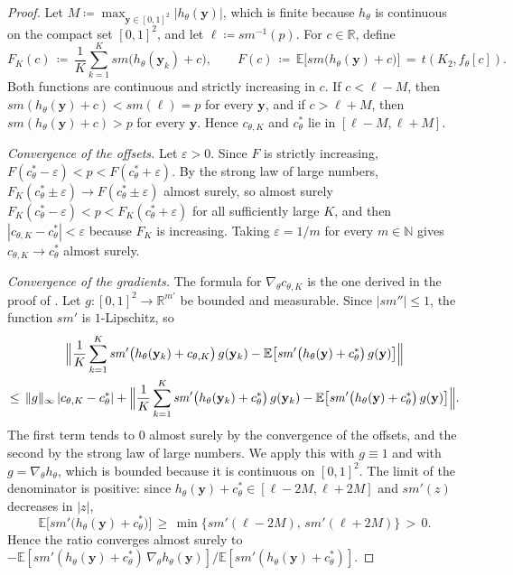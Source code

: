 \documentclass{article}
\theoremstyle{plain}
\theoremstyle{definition}
\theoremstyle{remark}
\newcommand*{\R}{\mathbb{R}}
\begin{document}
\begin{proof}
Let $M \coloneqq \max_{\mathbf{y} \in [0,1]^2} |h_\theta(\mathbf{y})|$, which is finite because $h_\theta$ is continuous on the compact set $[0,1]^2$, and let $\ell \coloneqq \mathit{sm}^{-1}(p)$. For $c \in \R$, define
\[
F_K(c) \,\coloneqq\, \frac{1}{K} \sum_{k=1}^{K} \mathit{sm}\bigl(h_\theta(\mathbf{y}_k) + c\bigr),
\qquad
F(c) \,\coloneqq\, \mathbb{E}\bigl[\mathit{sm}\bigl(h_\theta(\mathbf{y}) + c\bigr)\bigr] \,=\, t(K_2, f_\theta[c]).
\]
Both functions are continuous and strictly increasing in $c$. If $c < \ell - M$, then $\mathit{sm}(h_\theta(\mathbf{y}) + c) < \mathit{sm}(\ell) = p$ for every $\mathbf{y}$, and if $c > \ell + M$, then $\mathit{sm}(h_\theta(\mathbf{y}) + c) > p$ for every $\mathbf{y}$. Hence $c_{\theta,K}$ and $c^*_\theta$ lie in $[\ell - M, \ell + M]$.

\emph{Convergence of the offsets.} Let $\varepsilon > 0$. Since $F$ is strictly increasing, $F(c^*_\theta - \varepsilon) < p < F(c^*_\theta + \varepsilon)$. By the strong law of large numbers, $F_K(c^*_\theta \pm \varepsilon) \to F(c^*_\theta \pm \varepsilon)$ almost surely, so almost surely $F_K(c^*_\theta - \varepsilon) < p < F_K(c^*_\theta + \varepsilon)$ for all sufficiently large $K$, and then $|c_{\theta,K} - c^*_\theta| < \varepsilon$ because $F_K$ is increasing. Taking $\varepsilon = 1/m$ for every $m \in \mathbb{N}$ gives $c_{\theta,K} \to c^*_\theta$ almost surely.

\emph{Convergence of the gradients.} The formula for $\nabla_\theta c_{\theta,K}$ is the one derived in the proof of . Let $g : [0,1]^2 \to \R^{m'}$ be bounded and measurable. Since $|\mathit{sm}''| \le 1$, the function $\mathit{sm}'$ is $1$-Lipschitz, so
\begin{multline*}
\Bigl\| \frac{1}{K} \sum_{k=1}^{K} \mathit{sm}'\bigl(h_\theta(\mathbf{y}_k) + c_{\theta,K}\bigr)\, g(\mathbf{y}_k) - \mathbb{E}\bigl[\mathit{sm}'\bigl(h_\theta(\mathbf{y}) + c^*_\theta\bigr)\, g(\mathbf{y})\bigr] \Bigr\|
\\
\le\, \|g\|_\infty\, |c_{\theta,K} - c^*_\theta|
+ \Bigl\| \frac{1}{K} \sum_{k=1}^{K} \mathit{sm}'\bigl(h_\theta(\mathbf{y}_k) + c^*_\theta\bigr)\, g(\mathbf{y}_k) - \mathbb{E}\bigl[\mathit{sm}'\bigl(h_\theta(\mathbf{y}) + c^*_\theta\bigr)\, g(\mathbf{y})\bigr] \Bigr\|.
\end{multline*}
The first term tends to $0$ almost surely by the convergence of the offsets, and the second by the strong law of large numbers. We apply this with $g \equiv 1$ and with $g = \nabla_\theta h_\theta$, which is bounded because it is continuous on $[0,1]^2$. The limit of the denominator is positive: since $h_\theta(\mathbf{y}) + c^*_\theta \in [\ell - 2M, \ell + 2M]$ and $\mathit{sm}'(z)$ decreases in $|z|$,
\[
\mathbb{E}\bigl[\mathit{sm}'\bigl(h_\theta(\mathbf{y}) + c^*_\theta\bigr)\bigr]
\,\ge\, \min\bigl\{\mathit{sm}'(\ell - 2M),\, \mathit{sm}'(\ell + 2M)\bigr\} \,>\, 0.
\]
Hence the ratio converges almost surely to $-\mathbb{E}[\mathit{sm}'(h_\theta(\mathbf{y}) + c^*_\theta)\, \nabla_\theta h_\theta(\mathbf{y})] / \mathbb{E}[\mathit{sm}'(h_\theta(\mathbf{y}) + c^*_\theta)]$.


\end{proof}
\end{document}
